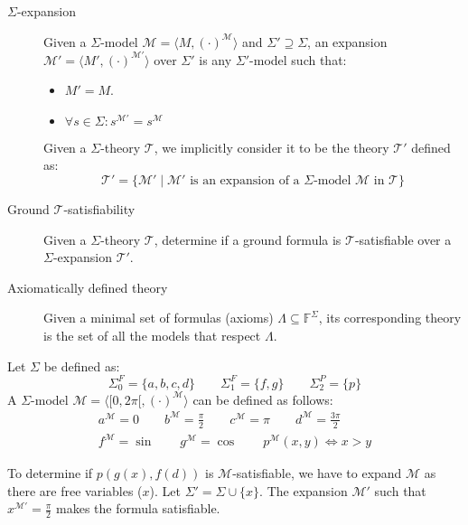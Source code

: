 \begin{description}
    \item[$\Sigma$-expansion] 
        Given a $\Sigma$-model $\mathcal{M} = \langle M, (\cdot)^\mathcal{M} \rangle$ and $\Sigma' \supseteq \Sigma$,
        an expansion $\mathcal{M}' = \langle M', (\cdot)^{\mathcal{M}'} \rangle$ over $\Sigma'$ is any $\Sigma'$-model such that:
        \begin{itemize}
            \item $M' = M$.
            \item $\forall s \in \Sigma: s^{\mathcal{M}'} = s^\mathcal{M}$
        \end{itemize}

        \begin{remark}
            Given a $\Sigma$-theory $\mathcal{T}$, we implicitly consider it to be the theory $\mathcal{T}'$ defined as:
            \[ \mathcal{T}' = \{ \mathcal{M}' \mid \mathcal{M}' \text{ is an expansion of a $\Sigma$-model } \mathcal{M} \text{ in } \mathcal{T}\} \]
        \end{remark}

    \item[Ground $\mathbf{\mathcal{T}}$-satisfiability] 
        Given a $\Sigma$-theory $\mathcal{T}$, determine if a ground formula is $\mathcal{T}$-satisfiable over a $\Sigma$-expansion $\mathcal{T}'$.

    \item[Axiomatically defined theory] 
        Given a minimal set of formulas (axioms) $\Lambda \subseteq \mathbb{F}^\Sigma$,
        its corresponding theory is the set of all the models that respect $\Lambda$.
\end{description}

\begin{example}
    Let $\Sigma$ be defined as:
    \[ \Sigma^F_0 = \{ a, b, c, d \} \hspace{2em} \Sigma^F_1 = \{ f, g \} \hspace{2em} \Sigma^P_2 = \{ p \} \]
    A $\Sigma$-model $\mathcal{M} = \langle [0, 2\pi[, (\cdot)^\mathcal{M} \rangle$ can be defined as follows:
    \begin{gather*}
        a^\mathcal{M} = 0 \hspace{2em} b^\mathcal{M} = \frac{\pi}{2} \hspace{2em} c^\mathcal{M} = \pi \hspace{2em} d^\mathcal{M} = \frac{3\pi}{2} \\
        f^\mathcal{M} = \sin \hspace{2em} g^\mathcal{M} = \cos \hspace{2em} p^\mathcal{M}(x, y) \iff x > y 
    \end{gather*}

    To determine if $p(g(x), f(d))$ is $\mathcal{M}$-satisfiable, we have to expand $\mathcal{M}$ as there are free variables ($x$).
    Let $\Sigma' = \Sigma \cup \{ x \}$. The expansion $\mathcal{M}'$ such that $x^{\mathcal{M}'} = \frac{\pi}{2}$ makes the formula satisfiable.
\end{example}


